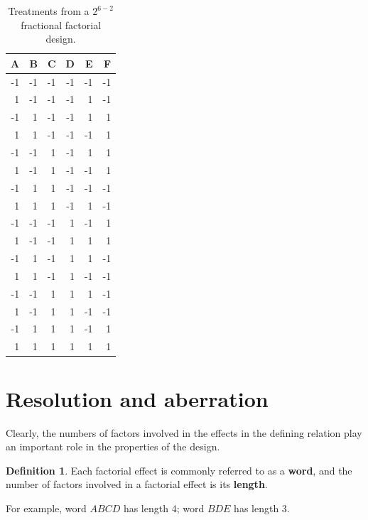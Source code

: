 \documentclass[
]{book}
\theoremstyle{definition}
\newtheorem{definition}{Definition}[chapter]
\theoremstyle{definition}
\theoremstyle{definition}
\theoremstyle{definition}
\theoremstyle{remark}
\begin{document}
\begin{table}

\caption{\label{tab:FrF2-example-design}Treatments from a $2^{6-2}$ fractional factorial design.}
\centering
\begin{tabular}[t]{r|r|r|r|r|r}
\hline
A & B & C & D & E & F\\
\hline
-1 & -1 & -1 & -1 & -1 & -1\\
\hline
1 & -1 & -1 & -1 & 1 & -1\\
\hline
-1 & 1 & -1 & -1 & 1 & 1\\
\hline
1 & 1 & -1 & -1 & -1 & 1\\
\hline
-1 & -1 & 1 & -1 & 1 & 1\\
\hline
1 & -1 & 1 & -1 & -1 & 1\\
\hline
-1 & 1 & 1 & -1 & -1 & -1\\
\hline
1 & 1 & 1 & -1 & 1 & -1\\
\hline
-1 & -1 & -1 & 1 & -1 & 1\\
\hline
1 & -1 & -1 & 1 & 1 & 1\\
\hline
-1 & 1 & -1 & 1 & 1 & -1\\
\hline
1 & 1 & -1 & 1 & -1 & -1\\
\hline
-1 & -1 & 1 & 1 & 1 & -1\\
\hline
1 & -1 & 1 & 1 & -1 & -1\\
\hline
-1 & 1 & 1 & 1 & -1 & 1\\
\hline
1 & 1 & 1 & 1 & 1 & 1\\
\hline
\end{tabular}
\end{table}

\hypertarget{resolution-and-aberration}{%
\section{Resolution and aberration}\label{resolution-and-aberration}}

Clearly, the numbers of factors involved in the effects in the defining relation play an important role in the properties of the design.

\begin{definition}
\protect\hypertarget{def:length}{}\label{def:length}Each factorial effect is commonly referred to as a \textbf{word}, and the number of factors involved in a factorial effect is its \textbf{length}.
\end{definition}

For example, word \(ABCD\) has length 4; word \(BDE\) has length 3.
\end{document}
